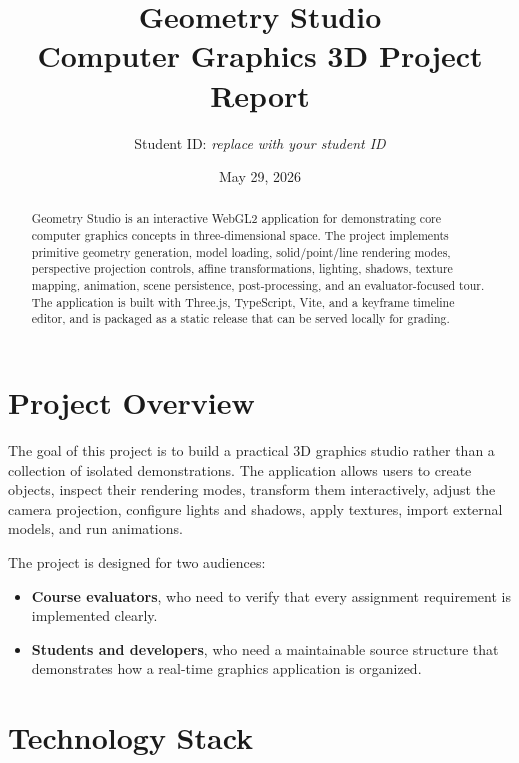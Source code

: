 \documentclass[12pt,a4paper]{article}
\title{\textbf{Geometry Studio}\\Computer Graphics 3D Project Report}
\author{Student ID: \textit{replace with your student ID}}
\date{May 29, 2026}
\begin{document}
\maketitle

\begin{abstract}
Geometry Studio is an interactive WebGL2 application for demonstrating core
computer graphics concepts in three-dimensional space. The project implements
primitive geometry generation, model loading, solid/point/line rendering modes,
perspective projection controls, affine transformations, lighting, shadows,
texture mapping, animation, scene persistence, post-processing, and an
evaluator-focused tour. The application is built with Three.js, TypeScript,
Vite, and a keyframe timeline editor, and is packaged as a static release that
can be served locally for grading.
\end{abstract}

\tableofcontents
\newpage

\section{Project Overview}

The goal of this project is to build a practical 3D graphics studio rather than
a collection of isolated demonstrations. The application allows users to create
objects, inspect their rendering modes, transform them interactively, adjust the
camera projection, configure lights and shadows, apply textures, import external
models, and run animations.

The project is designed for two audiences:
\begin{itemize}
  \item \textbf{Course evaluators}, who need to verify that every assignment
  requirement is implemented clearly.
  \item \textbf{Students and developers}, who need a maintainable source
  structure that demonstrates how a real-time graphics application is organized.
\end{itemize}

\section{Technology Stack}
\end{document}
